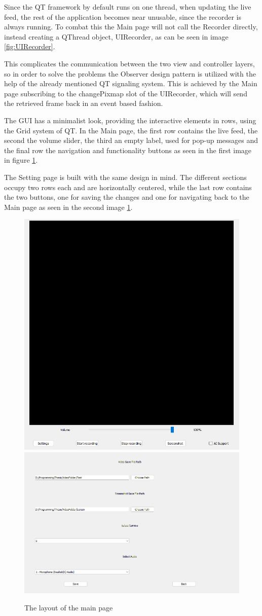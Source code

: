 \par Since the QT framework by default runs on one thread, when updating the live feed, the rest of the application becomes near unusable, since the recorder is always running. To combat this the Main page will not call the Recorder directly, instead creating a QThread object, UIRecorder, as can be seen in image \ref{fig:UIRecorder}.
\par This complicates the communication between the two view and controller layers, so in order to solve the problems the Observer design pattern \cite{observer} is utilized with the help of the already mentioned QT signaling system. This is achieved by the Main page subscribing to the changePixmap slot of the UIRecorder, which will send the retrieved frame back in an event based fashion.
\par The GUI has a minimalist look, providing the interactive elements in rows, using the Grid system of QT. In the Main page, the first row contains the live feed, the second the volume slider, the third an empty label, used for pop-up messages and the final row the navigation and functionality buttons as seen in the first image in figure \ref{fig:PageLooks}.
\par The Setting page is built with the same design in mind. The different sections occupy two rows each and are horizontally centered, while the last row contains the two buttons, one for saving the changes and one for navigating back to the Main page as seen in the second image \ref{fig:PageLooks}.

\begin{figure}
    \centering
    \includegraphics[width=0.4\linewidth]{figures/MainPage.png}
    \includegraphics[width=0.4\linewidth]{figures/SettingsPage.png}
    \caption{The layout of the main page}
    \label{fig:PageLooks}
\end{figure}

